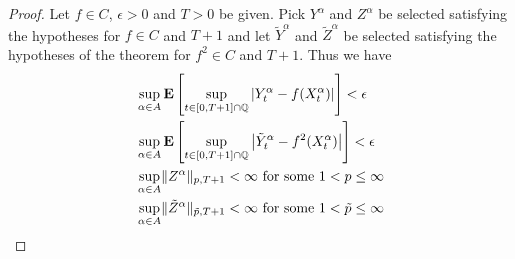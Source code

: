 \begin{proof}
Let $f \in C$, $\epsilon > 0$ and $T>0$ be given.  Pick $Y^\alpha$ and $Z^\alpha$ be selected satisfying the hypotheses for $f \in C$ and $T+1$ and let $\tilde{Y}^\alpha$ and $\tilde{Z}^\alpha$ be selected satisfying the hypotheses of the theorem for $f^2 \in C$ and $T+1$.  Thus we have
\begin{align*}
&\sup_{\alpha \in A} \textbf{E}\left[\sup_{t \in [0,T+1] \cap \mathbb{Q}} \left \vert Y^\alpha_t - f(X^\alpha_t) \right \vert\right] < \epsilon \\
&\sup_{\alpha \in A} \textbf{E}\left[\sup_{t \in [0,T+1] \cap \mathbb{Q}} \left \vert \tilde{Y}^\alpha_t - f^2(X^\alpha_t) \right \vert\right] < \epsilon \\
&\sup_{\alpha \in A} \lVert Z^\alpha \rVert_{p, T+1} < \infty \text{ for some $1 < p \leq \infty$} \\
&\sup_{\alpha \in A} \lVert \tilde{Z}^\alpha \rVert_{\tilde{p}, T+1} < \infty \text{ for some $1 < \tilde{p} \leq \infty$} \\
\end{align*}


\end{proof}
